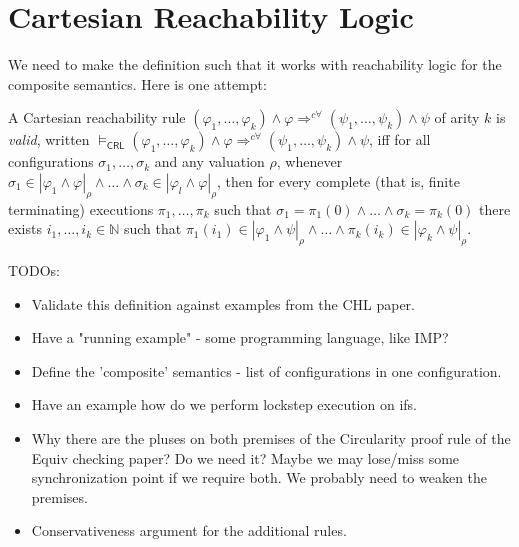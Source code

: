 \documentclass{article}
\newcommand{\CRL}{\mathsf{CRL}}
\begin{document}
\section{Cartesian Reachability Logic}

We need to make the definition such that it works with reachability logic for the composite semantics.
Here is one attempt:
\begin{definition}\label{def:CRLsemantics}
A Cartesian reachability rule
$(\varphi_1,\ldots,\varphi_k) \land \varphi \Rightarrow^{c\forall} (\psi_1,\ldots,\psi_k) \land \psi$
of arity $k$
is \emph{valid},
written
$\vDash_\CRL (\varphi_1,\ldots,\varphi_k) \land \varphi \Rightarrow^{c\forall}
(\psi_1,\ldots,\psi_k) \land \psi$,
iff for all configurations $\sigma_1,\ldots,\sigma_k$ and any valuation $\rho$,
whenever $\sigma_1 \in |\varphi_1 \land \varphi|_\rho \land \ldots \land \sigma_k \in |\varphi_l \land \varphi|_\rho$,
then for every complete (that is, finite terminating) executions $\pi_1, \ldots, \pi_k$ such that
$\sigma_1 = \pi_1(0) \land \ldots \land \sigma_k = \pi_k(0)$ there exists $i_1,\ldots,i_k \in \mathbb{N}$
such that
$\pi_1(i_1) \in |\varphi_1 \land \psi|_\rho \land \ldots \land \pi_k(i_k) \in |\varphi_k \land \psi|_\rho$.
\end{definition}

TODOs:
\begin{itemize}
    \item Validate this definition against examples from the CHL paper.
    \item Have a "running example" - some programming language, like IMP?
    \item Define the 'composite' semantics - list of configurations in one configuration.
    \item Have an example how do we perform lockstep execution on ifs.
    \item Why there are the pluses on both premises of the Circularity proof rule of the Equiv checking paper? Do we need it? Maybe we may lose/miss some synchronization point if we require both. We probably need to weaken the premises.
    \item Conservativeness argument for the additional rules.
\end{itemize}
\end{document}
